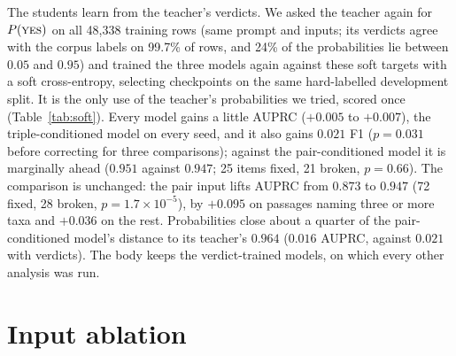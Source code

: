 \documentclass[11pt]{article}
\begin{document}
The students learn from the teacher's verdicts. We asked the teacher again for $P(\textsc{yes})$ on
all 48{,}338 training rows (same prompt and inputs; its verdicts agree with the corpus labels on
99.7\% of rows, and 24\% of the probabilities lie between $0.05$ and $0.95$) and trained the three
models again against these soft targets with a soft cross-entropy, selecting checkpoints on the
same hard-labelled development split. It is the only use of the teacher's probabilities we tried,
scored once (Table~\ref{tab:soft}). Every model gains a little AUPRC ($+0.005$ to $+0.007$), the
triple-conditioned model on every seed, and it also gains $0.021$ F1 ($p = 0.031$ before correcting
for three comparisons); against the pair-conditioned model it is marginally ahead ($0.951$ against
$0.947$; 25 items fixed, 21 broken, $p = 0.66$). The comparison is unchanged: the pair input lifts
AUPRC from $0.873$ to $0.947$ (72 fixed, 28 broken, $p = 1.7\times10^{-5}$), by $+0.095$ on passages
naming three or more taxa and $+0.036$ on the rest. Probabilities close about a quarter of the
pair-conditioned model's distance to its teacher's $0.964$ ($0.016$ AUPRC, against $0.021$ with
verdicts). The body keeps the verdict-trained models, on which every other analysis was run.

\section{Input ablation}
\label{app:ablation}

\begin{table}[t]\centering\small
\setlength{\tabcolsep}{4pt}
\caption{Degrading segment~A of the trained triple-conditioned model at inference, weights and its
own block-held-out thresholds unchanged; AUPRC of the three-checkpoint ensemble. Base rate $0.574$.
Per-seed standard deviations on AUPRC are $\le 0.032$. Bold: best F1 and AUPRC.}
\label{tab:ablation}
\end{table}
\end{document}
